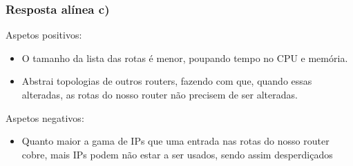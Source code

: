 \documentclass{article}
\begin{document}
\subsubsection{Resposta alínea c)}
Aspetos positivos:
\begin{itemize}
    \item O tamanho da lista das rotas é menor, poupando tempo no CPU e memória.
    \item Abstrai topologias de outros routers, fazendo com que, quando essas alteradas, as rotas do nosso router não precisem de ser alteradas.
\end{itemize}

Aspetos negativos:
\begin{itemize}
    \item Quanto maior a gama de IPs que uma entrada nas rotas do nosso router cobre, mais IPs podem não estar a ser usados, sendo assim desperdiçados
\end{itemize}
\end{document}
